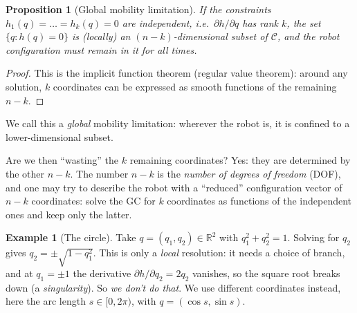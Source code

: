 \documentclass[11pt,a4paper]{article}
\theoremstyle{definition}
\newtheorem{example}[definition]{Example}
\theoremstyle{plain}
\newtheorem{proposition}[definition]{Proposition}
\theoremstyle{remark}
\begin{document}
\begin{proposition}[Global mobility limitation]\label{prop:global}
If the constraints $h_1(q)=\dots=h_k(q)=0$ are independent, i.e.\ $\partial h/\partial q$ has rank $k$, the set $\{q: h(q)=0\}$ is (locally) an $(n-k)$-dimensional subset of $\mathcal C$, and the robot configuration must remain in it for all times.
\end{proposition}
\begin{proof}
This is the implicit function theorem (regular value theorem): around any solution, $k$ coordinates can be expressed as smooth functions of the remaining $n-k$.
\end{proof}
 
We call this a \emph{global} mobility limitation: wherever the robot is, it is confined to a lower-dimensional subset.
 
\begin{intuition}
Are we then ``wasting'' the $k$ remaining coordinates? Yes: they are determined by the other $n-k$. The number $n-k$ is the \emph{number of degrees of freedom} (DOF), and one may try to describe the robot with a ``reduced'' configuration vector of $n-k$ coordinates: solve the GC for $k$ coordinates as functions of the independent ones and keep only the latter.
\end{intuition}
 
\begin{example}[The circle]\label{ex:circle}
Take $q=(q_1,q_2)\in\mathbb R^2$ with $q_1^2+q_2^2=1$. Solving for $q_2$ gives $q_2=\pm\sqrt{1-q_1^2}$. This is only a \emph{local} resolution: it needs a choice of branch, and at $q_1=\pm1$ the derivative $\partial h/\partial q_2=2q_2$ vanishes, so the square root breaks down (a \emph{singularity}). So \emph{we don't do that}. We use different coordinates instead, here the arc length $s\in[0,2\pi)$, with $q=(\cos s,\sin s)$.
\end{example}
 
\end{document}
